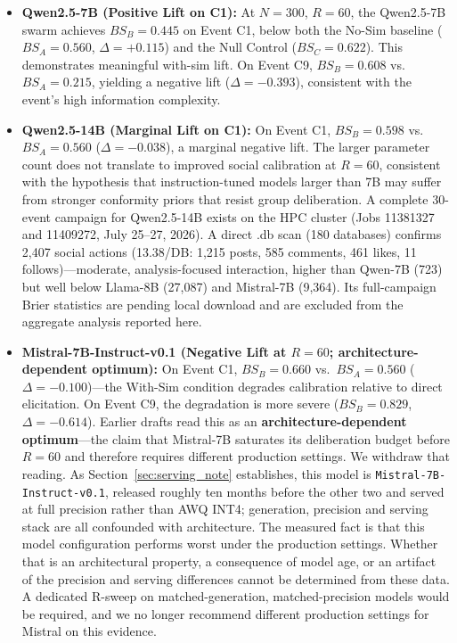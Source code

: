 \documentclass[11pt,journal,onecolumn]{IEEEtran}
\begin{document}
\begin{itemize}
    \item \textbf{Qwen2.5-7B (Positive Lift on C1):} At $N=300$, $R=60$, the Qwen2.5-7B swarm achieves $BS_B = 0.445$ on Event C1, below both the No-Sim baseline ($BS_A = 0.560$, $\Delta = +0.115$) and the Null Control ($BS_C = 0.622$). This demonstrates meaningful with-sim lift. On Event C9, $BS_B = 0.608$ vs.~$BS_A = 0.215$, yielding a negative lift ($\Delta = -0.393$), consistent with the event's high information complexity.
    \item \textbf{Qwen2.5-14B (Marginal Lift on C1):} On Event C1, $BS_B = 0.598$ vs.~$BS_A = 0.560$ ($\Delta = -0.038$), a marginal negative lift. The larger parameter count does not translate to improved social calibration at $R=60$, consistent with the hypothesis that instruction-tuned models larger than 7B may suffer from stronger conformity priors that resist group deliberation. A complete 30-event campaign for Qwen2.5-14B exists on the HPC cluster (Jobs 11381327 and 11409272, July 25--27, 2026). A direct .db scan (180 databases) confirms 2,407 social actions (13.38/DB: 1,215 posts, 585 comments, 461 likes, 11 follows)---moderate, analysis-focused interaction, higher than Qwen-7B (723) but well below Llama-8B (27,087) and Mistral-7B (9,364). Its full-campaign Brier statistics are pending local download and are excluded from the aggregate analysis reported here.
    \item \textbf{Mistral-7B-Instruct-v0.1 (Negative Lift at $R=60$; architecture-dependent optimum):} On Event C1, $BS_B = 0.660$ vs.~$BS_A = 0.560$ ($\Delta = -0.100$)---the With-Sim condition degrades calibration relative to direct elicitation. On Event C9, the degradation is more severe ($BS_B = 0.829$, $\Delta = -0.614$). Earlier drafts read this as an \textbf{architecture-dependent optimum}---the claim that Mistral-7B saturates its deliberation budget before $R=60$ and therefore requires different production settings. We withdraw that reading. As Section~\ref{sec:serving_note} establishes, this model is \texttt{Mistral-7B-Instruct-v0.1}, released roughly ten months before the other two and served at full precision rather than AWQ INT4; generation, precision and serving stack are all confounded with architecture. The measured fact is that this model configuration performs worst under the production settings. Whether that is an architectural property, a consequence of model age, or an artifact of the precision and serving differences cannot be determined from these data. A dedicated R-sweep on matched-generation, matched-precision models would be required, and we no longer recommend different production settings for Mistral on this evidence.
\end{itemize}
\end{document}
